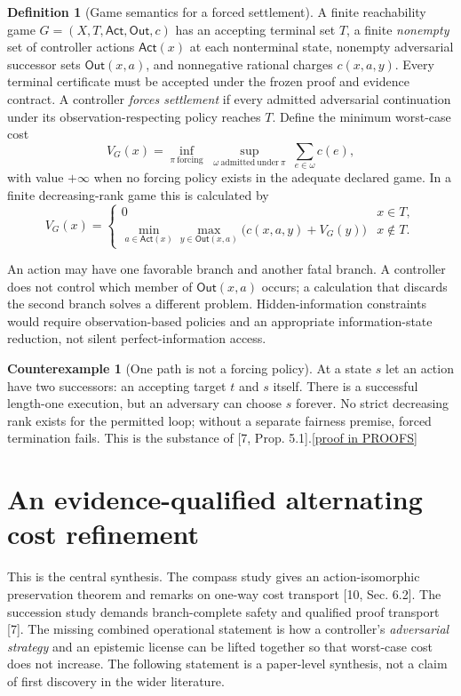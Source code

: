 \documentclass[11pt,letterpaper]{article}
\theoremstyle{definition}
\newtheorem{definition}[theorem]{Definition}
\newtheorem{counterexample}[theorem]{Counterexample}
\theoremstyle{remark}
\newcommand{\Act}{\mathsf{Act}}
\newcommand{\Out}{\mathsf{Out}}
\newcommand{\prooflink}[1]{\hfill\hyperlink{proof:#1}{\footnotesize[proof in PROOFS]}}
\newcommand{\src}[1]{\textup{[#1]}}
\begin{document}
\begin{definition}[Game semantics for a forced settlement]\label{def:game}
A finite reachability game $G=(X,T,\Act,\Out,c)$ has an accepting terminal set $T$, a finite \emph{nonempty} set of controller actions $\Act(x)$ at each nonterminal state, nonempty adversarial successor sets $\Out(x,a)$, and nonnegative rational charges $c(x,a,y)$. Every terminal certificate must be accepted under the frozen proof and evidence contract. A controller \emph{forces settlement} if every admitted adversarial continuation under its observation-respecting policy reaches $T$. Define the minimum worst-case cost
\[
 V_G(x)=\inf_{\pi\ \mathrm{forcing}}\;\sup_{\omega\ \mathrm{admitted\ under}\ \pi}\;\sum_{e\in\omega}c(e),
\]
with value $+\infty$ when no forcing policy exists in the adequate declared game. In a finite decreasing-rank game this is calculated by
\[
 V_G(x)=\begin{cases}0&x\in T,\\
 \displaystyle\min_{a\in\Act(x)}\max_{y\in\Out(x,a)}\bigl(c(x,a,y)+V_G(y)\bigr)&x\notin T.
 \end{cases}
\]
\end{definition}

An action may have one favorable branch and another fatal branch. A controller does not control which member of $\Out(x,a)$ occurs; a calculation that discards the second branch solves a different problem. Hidden-information constraints would require observation-based policies and an appropriate information-state reduction, not silent perfect-information access.

\begin{counterexample}[One path is not a forcing policy]\label{cex:loop}\hypertarget{claim:loop}{}
At a state $s$ let an action have two successors: an accepting target $t$ and $s$ itself. There is a successful length-one execution, but an adversary can choose $s$ forever. No strict decreasing rank exists for the permitted loop; without a separate fairness premise, forced termination fails. This is the substance of \src{7, Prop. 5.1}.\prooflink{loop}
\end{counterexample}

\section{An evidence-qualified alternating cost refinement}
This is the central synthesis. The compass study gives an action-isomorphic preservation theorem and remarks on one-way cost transport \src{10, Sec. 6.2}. The succession study demands branch-complete safety and qualified proof transport \src{7}. The missing combined operational statement is how a controller's \emph{adversarial strategy} and an epistemic license can be lifted together so that worst-case cost does not increase. The following statement is a paper-level synthesis, not a claim of first discovery in the wider literature.
\end{document}
